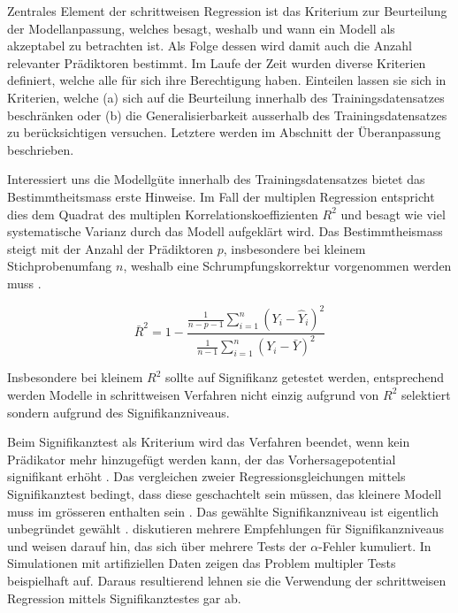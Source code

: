 Zentrales Element der schrittweisen Regression ist das Kriterium zur Beurteilung der  Modellanpassung, welches besagt, weshalb und wann ein Modell als akzeptabel zu betrachten ist. Als Folge dessen wird damit auch die Anzahl relevanter Prädiktoren bestimmt. Im Laufe der Zeit wurden diverse Kriterien definiert, welche alle für sich ihre Berechtigung haben.
Einteilen lassen sie sich in Kriterien, welche (a) sich auf die Beurteilung innerhalb des Trainingsdatensatzes beschränken oder (b) die Generalisierbarkeit ausserhalb des Trainingsdatensatzes zu berücksichtigen versuchen. Letztere werden im Abschnitt der Überanpassung beschrieben.

Interessiert uns die Modellgüte innerhalb des Trainingsdatensatzes bietet das Bestimmtheitsmass erste Hinweise. Im Fall der multiplen Regression entspricht dies dem Quadrat des multiplen Korrelationskoeffizienten $R^2$ und  besagt wie viel systematische Varianz durch das Modell aufgeklärt  wird. 
Das Bestimmtheismass steigt mit der Anzahl der Prädiktoren $p$, insbesondere bei kleinem Stichprobenumfang $n$, weshalb eine Schrumpfungskorrektur vorgenommen werden muss \cite[p. 451]{bortz2011}. 

\begin{equation}
\bar R^2=1-\frac{\displaystyle \frac{1}{n-p-1} \sum_{i=1}^n (Y_i-\hat{Y}_i)^2}{\displaystyle \frac{1}{n-1} \sum_{i=1}^n (Y_i-\bar{Y})^2}
\tag{korrigiertes Bestimmtheitsmass}
\end{equation}

Insbesondere bei kleinem $R^2$ sollte auf Signifikanz getestet werden, entsprechend werden Modelle in schrittweisen Verfahren nicht einzig aufgrund von $R^2$ selektiert sondern aufgrund des Signifikanzniveaus. 

Beim Signifikanztest als Kriterium wird das Verfahren beendet, wenn kein Prädikator mehr hinzugefügt werden kann, der das Vorhersagepotential signifikant erhöht \cite[p.48]{bendel1977comparison}. 
Das vergleichen zweier Regressionsgleichungen mittels Signifikanztest bedingt, dass diese geschachtelt sein müssen, das kleinere Modell muss im grösseren enthalten sein \cite[p. 508]{jacob2003applied}.
Das gewählte Signifikanzniveau ist eigentlich unbegründet gewählt \cite[p. 174]{weakliem2004introduction}.  diskutieren mehrere Empfehlungen für Signifikanzniveaus und weisen darauf hin, das sich über mehrere Tests der $\alpha$-Fehler kumuliert. 
In  Simulationen mit artifiziellen Daten zeigen  das  Problem multipler Tests beispielhaft auf. 
Daraus resultierend lehnen sie die Verwendung der schrittweisen Regression mittels Signifikanztestes gar ab.

